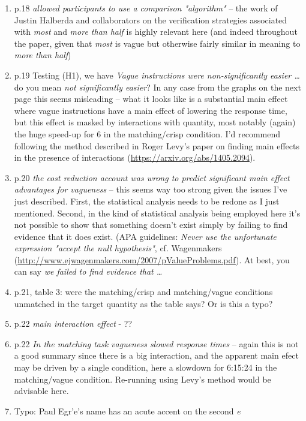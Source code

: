 \documentclass{tufte-handout}
\begin{document}
\begin{enumerate}
\item
p.18 \emph{allowed participants to use a comparison "algorithm"} -- the work of Justin Halberda and collaborators on the verification strategies associated with \emph{most} and \emph{more than half} is highly relevant here (and indeed throughout the paper, given that \emph{most} is vague but otherwise fairly similar in meaning to \emph{more than half})
\item
p.19 Testing (H1), we have \emph{Vague instructions were non-significantly easier \ldots} do you mean \emph{not significantly easier}? In any case from the graphs on the next page this seems misleading -- what it looks like is a substantial main effect where vague instructions have a main effect of lowering the response time, but this effect is masked by interactions with quantity, most notably (again) the huge speed-up for 6 in the matching/crisp condition. I'd recommend following the method described in Roger Levy's paper on finding main effects in the presence of interactions (\url{https://arxiv.org/abs/1405.2094}).
\item
p.20 \emph{the cost reduction account was wrong to predict significant main effect advantages for vagueness} -- this seems way too strong given the issues I've just described. First, the statistical analysis needs to be redone as I just mentioned. Second, in the kind of statistical analysis being employed here it's not possible to show that something doesn't exist simply by failing to find evidence that it does exist. (APA guidelines: \emph{Never use the unfortunate expression "accept the null hypothesis"}, cf. Wagenmakers (\url{http://www.ejwagenmakers.com/2007/pValueProblems.pdf}). At best, you can say \emph{we failed to find evidence that \ldots}
\item
p.21, table 3: were the matching/crisp and matching/vague conditions unmatched in the target quantity as the table says? Or is this a typo?
\item
p.22 \emph{main interaction effect} - ??
\item
p.22 \emph{In the matching task vagueness slowed response times} -- again this is not a good summary since there is a big interaction, and the apparent main efect may be driven by a single condition, here a slowdown for 6:15:24 in the matching/vague condition. Re-running using Levy's method would be advisable here.
\item
Typo: Paul Egr\a'e's name has an acute accent on the second \emph{e}
\end{enumerate}
\end{document}

